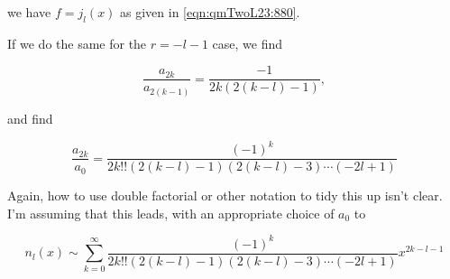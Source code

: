 we have $f = j_l(x)$ as given in \ref{eqn:qmTwoL23:880}.

If we do the same for the $r = -l-1$ case, we find

\begin{equation}\label{eqn:qmTwoL23:1100b}
\frac{
a_{2k} 
}{a_{2(k-1)}}
= 
\frac{-1}{
2k (2 (k-l) - 1) 
},
\end{equation}

and find

\begin{equation}\label{eqn:qmTwoL23:1160}
\frac{a_{2k}}{a_0} = 
\frac{(-1)^k}{2k!! (2(k-l) -1)(2(k-l)-3)\cdots(-2l + 1)}
\end{equation}

Again, how to use double factorial or other notation to tidy this up isn't clear.  I'm assuming that this leads, with an appropriate choice of $a_0$ to 

\begin{equation}\label{eqn:qmTwoL23:1180}
n_l(x) \sim 
\sum_{k=0}^\infty
\frac{(-1)^k}{2k!! (2(k-l) -1)(2(k-l)-3)\cdots(-2l + 1)} x^{2k -l -1}
\end{equation}

\EndArticle
